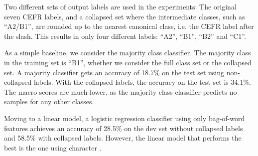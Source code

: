 Two different sets of output labels are used in the experiments: The original
seven CEFR labels, and a collapsed set where the intermediate classes, such
as ``A2/B1'', are rounded up to the nearest canonical class, i.e. the CEFR
label after the slash. This results in only four different labels: ``A2'',
``B1'', ``B2'' and ``C1''.

As a simple baseline, we consider the majority class classifier. The majority
class in the training set is ``B1'', whether we consider the full class set
or the collapsed set. A majority classifier gets an accuracy of 18.7\% on the
test set using non-collapsed labels. With the collapsed labels, the accuracy
on the test set is 34.1\%. The macro \FI scores are much lower, as the
majority class classifier predicts no samples for any other classes.

Moving to a linear model, a logistic regression classifier using only
bag-of-word features achieves an accuracy of 28.5\% on the dev set without
collapsed labels and 58.5\% with collapsed labels. However, the linear model
that performs the best is the one using character \ngrams.

